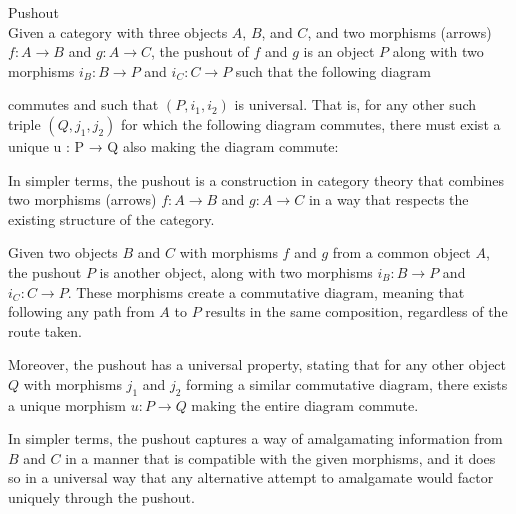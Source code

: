 \begin{definition}{Pushout}\\
Given a category with three objects $A$, $B$, and $C$, and two morphisms (arrows) $f: A \to B$ and $g: A \to C$, the pushout of $f$ and $g$ is an object $P$ along with two morphisms $i_B: B \to P$ and $i_C: C \to P$ such that the following diagram 
\begin{center}
\end{center}
commutes and such that $(P, i_1, i_2)$ is universal. That is, for any other such triple $(Q, j_1, j_2)$ for which the following diagram commutes, there must exist a unique u : P → Q also making the diagram commute:
\begin{center}
\end{center}
In simpler terms, the pushout is a construction in category theory that combines two morphisms (arrows) $f: A \to B$ and $g: A \to C$ in a way that respects the existing structure of the category.

Given two objects $B$ and $C$ with morphisms $f$ and $g$ from a common object $A$, the pushout $P$ is another object, along with two morphisms $i_B: B \to P$ and $i_C: C \to P$. These morphisms create a commutative diagram, meaning that following any path from $A$ to $P$ results in the same composition, regardless of the route taken.

Moreover, the pushout has a universal property, stating that for any other object $Q$ with morphisms $j_1$ and $j_2$ forming a similar commutative diagram, there exists a unique morphism $u: P \to Q$ making the entire diagram commute.

In simpler terms, the pushout captures a way of amalgamating information from $B$ and $C$ in a manner that is compatible with the given morphisms, and it does so in a universal way that any alternative attempt to amalgamate would factor uniquely through the pushout.
\end{definition}\\

